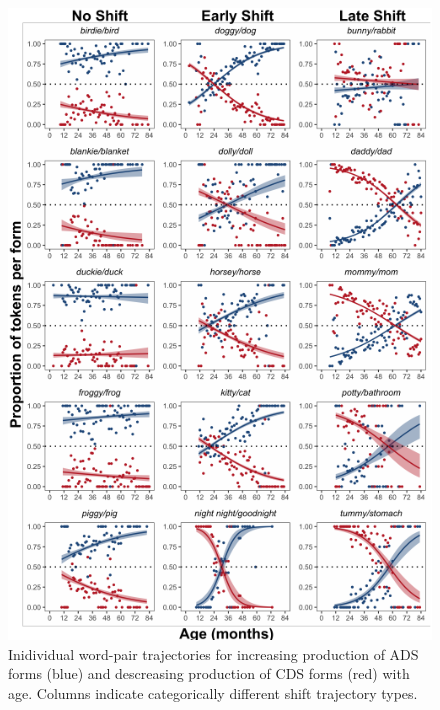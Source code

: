 \documentclass[10pt, letterpaper]{article}
\newenvironment{CodeChunk}{}{}
\begin{document}
\begin{CodeChunk}
\begin{figure}[!ht]

{\centering \includegraphics{figs/shift-timing-bypair-fig-1} 

}

\caption[Inidividual word-pair trajectories for increasing production of ADS forms (blue) and descreasing production of CDS forms (red) with age]{Inidividual word-pair trajectories for increasing production of ADS forms (blue) and descreasing production of CDS forms (red) with age. Columns indicate categorically different shift trajectory types.}\label{fig:shift-timing-bypair-fig}
\end{figure}
\end{CodeChunk}
\end{document}
